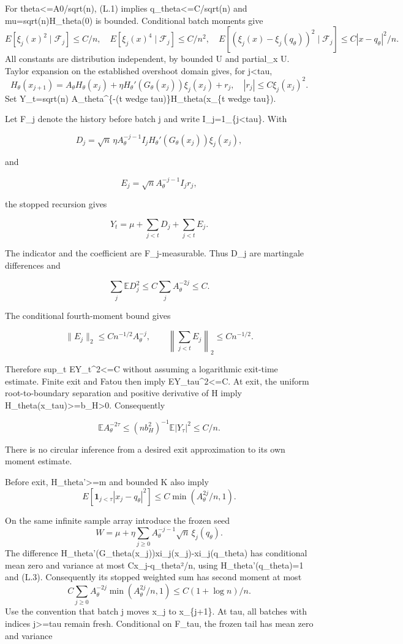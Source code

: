 For \textbar theta\textbar\textless=A0/sqrt(n), (L.1) implies
\textbar q\_theta\textbar\textless=C/sqrt(n) and mu=sqrt(n)H\_theta(0)
is bounded. Conditional batch moments give \[
E[\xi_j(x)^2\mid\mathcal F_j]\le C/n,\quad
E[\xi_j(x)^4\mid\mathcal F_j]\le C/n^2,\quad
E[(\xi_j(x)-\xi_j(q_\theta))^2\mid\mathcal F_j]
\le C|x-q_\theta|^2/n.
\] All constants are distribution independent, by bounded U and
partial\_x U. Taylor expansion on the established overshoot domain
gives, for j\textless tau, \[
H_\theta(x_{j+1})=A_\theta H_\theta(x_j)
 +\eta H_\theta'(G_\theta(x_j))\xi_j(x_j)+r_j,
\quad |r_j|\le C\xi_j(x_j)^2.
\] Set Y\_t=sqrt(n) A\_theta\^{}\{-(t wedge tau)\}H\_theta(x\_\{t wedge
tau\}).

Let F\_j denote the history before batch j and write
I\_j=1\_\{j\textless tau\}. With

\[
D_j=\sqrt n\,\eta A_\theta^{-j-1} I_j
 H_\theta'(G_\theta(x_j))\xi_j(x_j),
\]

and

\[
E_j=\sqrt n A_\theta^{-j-1}I_j r_j,
\]

the stopped recursion gives

\[
Y_t=\mu+\sum_{j<t}D_j+\sum_{j<t}E_j.
\]

The indicator and the coefficient are F\_j-measurable. Thus D\_j are
martingale differences and

\[
\sum_j\mathbb E D_j^2\le C\sum_j A_\theta^{-2j}\le C.
\]

The conditional fourth-moment bound gives

\[
\|E_j\|_2\le C n^{-1/2}A_\theta^{-j},
\qquad \left\|\sum_{j<t}E_j\right\|_2\le Cn^{-1/2}.
\]

Therefore sup\_t E\textbar Y\_t\textbar\^{}2\textless=C without assuming
a logarithmic exit-time estimate. Finite exit and Fatou then imply
E\textbar Y\_tau\textbar\^{}2\textless=C. At exit, the uniform
root-to-boundary separation and positive derivative of H imply
\textbar H\_theta(x\_tau)\textbar\textgreater=b\_H\textgreater0.
Consequently

\[
\mathbb E A_\theta^{-2\tau}\le (nb_H^2)^{-1}\mathbb E|Y_\tau|^2\le C/n.
\]

There is no circular inference from a desired exit approximation to its
own moment estimate.

Before exit, H\_theta'\textgreater=m and bounded K also imply \[
E[\mathbf1_{j<\tau}|x_j-q_\theta|^2]\le C\min(A_\theta^{2j}/n,1).
\tag{L.4}
\]

On the same infinite sample array introduce the frozen seed \[
W=\mu+\eta\sum_{j\ge0}A_\theta^{-j-1}\sqrt n\,\xi_j(q_\theta).
\] The difference H\_theta'(G\_theta(x\_j))xi\_j(x\_j)-xi\_j(q\_theta)
has conditional mean zero and variance at most
C\textbar x\_j-q\_theta\textbar²/n, using H\_theta'(q\_theta)=1 and
(L.3). Consequently its stopped weighted sum has second moment at most
\[
C\sum_{j\ge0}A_\theta^{-2j}\min(A_\theta^{2j}/n,1)
\le C(1+\log n)/n.
\] Use the convention that batch j moves x\_j to x\_\{j+1\}. At tau, all
batches with indices j\textgreater=tau remain fresh. Conditional on
F\_tau, the frozen tail has mean zero and variance

